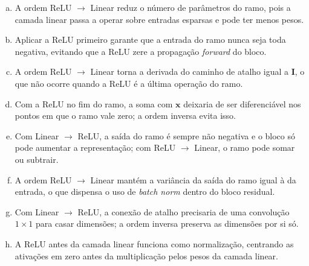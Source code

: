 \documentclass[11pt,a4paper]{article}
\begin{document}
\begin{enumerate}[1)]
\begin{enumerate}[a)]
    \item A ordem ReLU $\to$ Linear reduz o número de parâmetros do ramo, pois a camada linear passa a operar sobre entradas esparsas e pode ter menos pesos.
    \item Aplicar a ReLU primeiro garante que a entrada do ramo nunca seja toda negativa, evitando que a ReLU zere a propagação \textit{forward} do bloco.
    \item A ordem ReLU $\to$ Linear torna a derivada do caminho de atalho igual a $\mathbf{I}$, o que não ocorre quando a ReLU é a última operação do ramo.
    \item Com a ReLU no fim do ramo, a soma com $\mathbf{x}$ deixaria de ser diferenciável nos pontos em que o ramo vale zero; a ordem inversa evita isso.
    \item Com Linear $\to$ ReLU, a saída do ramo é sempre não negativa e o bloco só pode aumentar a representação; com ReLU $\to$ Linear, o ramo pode somar ou subtrair.
    \item A ordem ReLU $\to$ Linear mantém a variância da saída do ramo igual à da entrada, o que dispensa o uso de \textit{batch norm} dentro do bloco residual.
    \item Com Linear $\to$ ReLU, a conexão de atalho precisaria de uma convolução $1 \times 1$ para casar dimensões; a ordem inversa preserva as dimensões por si só.
    \item A ReLU antes da camada linear funciona como normalização, centrando as ativações em zero antes da multiplicação pelos pesos da camada linear.
\end{enumerate}


\end{enumerate}
\end{document}
